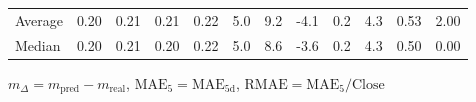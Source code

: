 \begin{threeparttable}
{\begin{tabular}{lrrrrrrrrrrr}
Average &          0.20 &          0.21 &          0.21 &        0.22 &                 5.0 &                 9.2 &       -4.1 &                 0.2 &              4.3 &            0.53 &                   2.00 \\
 Median &          0.20 &          0.21 &          0.20 &        0.22 &                 5.0 &                 8.6 &       -3.6 &                 0.2 &              4.3 &            0.50 &                   0.00 \\
\bottomrule
\end{tabular}
}
\begin{tablenotes}\footnotesize
\item $m_\Delta=m_{\text{pred}}-m_{\text{real}}$,
$\mathrm{MAE}_5=\mathrm{MAE}_{5\text{d}}$,
$\mathrm{RMAE}=\mathrm{MAE}_5/\text{Close}$
\end{tablenotes}
\end{threeparttable}
\endgroup


